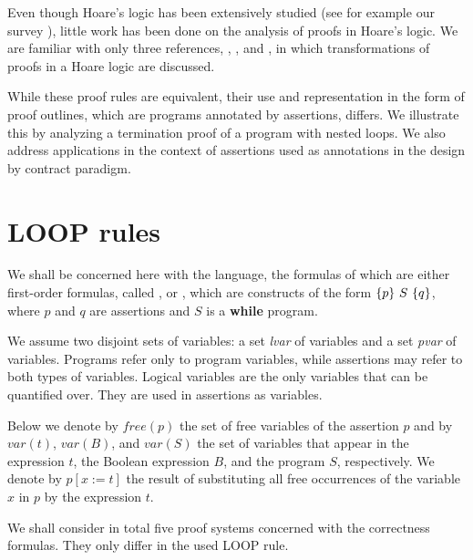 \documentclass[runningheads]{llncs}       %
\begin{document}
Even though Hoare's logic has been extensively studied (see for
example our survey \cite{AO19}), little work has been done on the
analysis of proofs in Hoare's logic. We are familiar with only three
references, \cite{Apt81a}, \cite{GR16}, and \cite{Tiu02}, in which
transformations of proofs in a Hoare logic are discussed.

While these proof rules are equivalent, their use and representation
in the form of proof outlines, which are programs annotated by
assertions, differs. We illustrate this by analyzing a termination
proof of a program with nested loops. We also address applications in
the context of assertions used as annotations in the design by
contract paradigm.


\section{LOOP rules}

We shall be concerned here with the language, the formulas of
which are either first-order formulas, called , or
, which are constructs of the form $\mbox{$\{{p}\}\ {S}\ \{{q}\}$}$,
where $p$ and $q$ are assertions and $S$ is a \textbf{while} program.

We assume two disjoint sets of variables: a set \emph{lvar} of
 variables and a set \emph{pvar} of 
variables. Programs refer only to program variables, while assertions
may refer to both types of variables.  Logical variables are the only
variables that can be quantified over. They are used in assertions as
 variables.

Below we denote by $\mathit{free}(p)$
the set of free variables of the assertion $p$ and by $var(t)$, $var(B)$, and $var(S)$ 
the set of variables that appear in the
expression $t$, the Boolean expression $B$, and the program $S$, respectively.
%
% 
%
We denote by $p[x:=t]$ the result of substituting all free occurrences
of the variable $x$ in $p$ by the expression $t$. 



We shall consider in total five proof systems concerned with the
correctness formulas. They only differ in the used LOOP rule.
\end{document}
